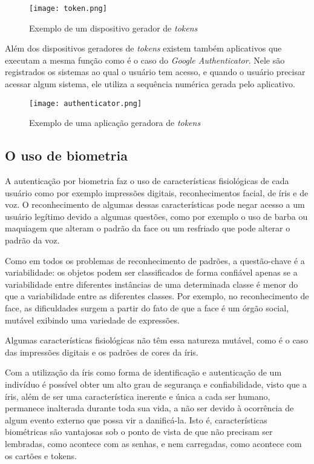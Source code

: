 \begin{figure}[!htb]
	\centering
	\texttt{[image: token.png]}
	\small
	\caption[Exemplo de um dispositivo gerador de \textit{tokens}]{Exemplo de um dispositivo gerador de \textit{tokens}}
	\label{fig:token}
\end{figure}

Além dos dispositivos geradores de \textit{tokens} existem também aplicativos que executam a mesma função como é o caso do \textit{Google Authenticator}. Nele são registrados os sistemas ao qual o usuário tem acesso, e quando o usuário precisar acessar algum sistema, ele utiliza a sequência numérica gerada pelo aplicativo.

\begin{figure}[!htb]
	\centering
	\texttt{[image: authenticator.png]}
	\small
	\caption[Exemplo de uma aplicação geradora de \textit{tokens}]{Exemplo de uma aplicação geradora de \textit{tokens}}
	\label{fig:token}
\end{figure}

\subsection{O uso de biometria}
A autenticação por biometria faz o uso de características fisiológicas de cada usuário como por exemplo impressões digitais, reconhecimentos facial, de íris e de voz.
O reconhecimento de algumas dessas características pode negar acesso a um usuário legítimo devido a algumas questões, como por exemplo o uso de barba ou maquiagem que alteram o padrão da face ou um resfriado que pode alterar o padrão da voz.

\begin{citacao}
Como em todos os problemas de reconhecimento de padrões, a questão-chave é a variabilidade: os objetos podem ser classificados de forma confiável apenas se a variabilidade entre diferentes instâncias de uma determinada classe é menor do que a variabilidade entre as diferentes classes. Por exemplo, no reconhecimento de face, as dificuldades surgem a partir do fato de que a face é um órgão social, mutável exibindo uma variedade de expressões. \cite{Daugman2004}
\end{citacao}

Algumas características fisiológicas não têm essa natureza mutável, como é o caso das impressões digitais e os padrões de cores da íris.

\begin{citacao}
Com a utilização da íris como forma de identificação e autenticação de um indivíduo é possível obter um alto grau de segurança e confiabilidade, visto que a íris, além de ser uma característica inerente e única a cada ser humano, permanece inalterada durante toda sua vida, a não ser devido à ocorrência de algum evento externo que possa vir a danificá-la. Isto é, características biométricas são vantajosas sob o ponto de vista de que não precisam ser lembradas, como acontece com as senhas, e nem carregadas, como acontece com os cartões e tokens. \cite{priscila2007}
\end{citacao}

